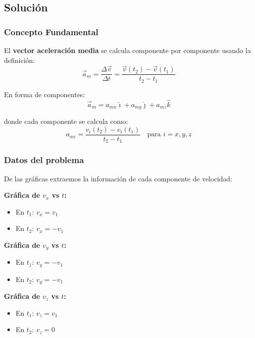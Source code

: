 \documentclass[12pt, a4paper]{article}
\begin{document}
\subsection*{Solución}

\subsubsection*{Concepto Fundamental}
El \textbf{vector aceleración media} se calcula componente por componente usando la definición:
\begin{equation}
\vec{a}_m = \frac{\Delta \vec{v}}{\Delta t} = \frac{\vec{v}(t_2) - \vec{v}(t_1)}{t_2 - t_1}
\end{equation}

En forma de componentes:
\begin{equation}
\vec{a}_m = a_{mx}\hat{\imath} + a_{my}\hat{\jmath} + a_{mz}\hat{k}
\end{equation}

donde cada componente se calcula como:
\begin{equation}
a_{mi} = \frac{v_i(t_2) - v_i(t_1)}{t_2 - t_1} \quad \text{para } i = x, y, z
\end{equation}

\subsubsection*{Datos del problema}
De las gráficas extraemos la información de cada componente de velocidad:

\textbf{Gráfica de $v_x$ vs $t$:}
\begin{itemize}[leftmargin=2cm]
    \item En $t_1$: $v_x = v_1$
    \item En $t_2$: $v_x = -v_1$
\end{itemize}

\textbf{Gráfica de $v_y$ vs $t$:}
\begin{itemize}[leftmargin=2cm]
    \item En $t_1$: $v_y = -v_1$
    \item En $t_2$: $v_y = -v_1$
\end{itemize}

\textbf{Gráfica de $v_z$ vs $t$:}
\begin{itemize}[leftmargin=2cm]
    \item En $t_1$: $v_z = v_1$
    \item En $t_2$: $v_z = 0$
\end{itemize}
\end{document}
